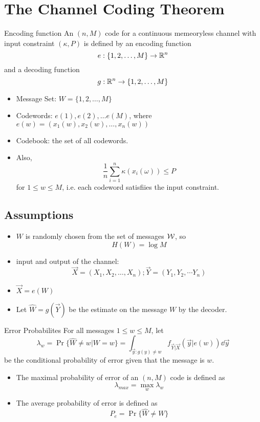 \documentclass[../main.tex]{subfiles}
\begin{document}
\section{The Channel Coding Theorem}
\begin{gbox}{Encoding function}
    An $(n,M)$ code for a continuous memeoryless channel with input constraint $(\kappa, P)$ is defined by an encoding function \[
    e:\{1,2,\dots,M\}\to \mathbb{R}^n
    \] and a decoding function \[
    g:\mathbb{R}^n \to \{1,2,\dots, M\}
    \]
    \begin{itemize}
        \item Message Set: $W=\{1,2,\dots, M\}$
        \item Codewords: $e(1),e(2),\dots e(M)$, where $e(w)=(x_1(w), x_2(w),\dots, x_n(w))$
        \item Codebook: the set of all codewords. 
        \item Also, \[
        \frac{1}{n}\sum_{i=1}^n\kappa(x_i(\omega))\leq P
        \] for $1\leq w \leq M$, i.e. each codeword satisfiies the input constraint.
    \end{itemize}
\end{gbox}
\subsection{Assumptions}
\begin{itemize}
    \item $W$ is randomly chosen from the set of messages $\mathcal{W}$, so \[
    H(W)=\log M
    \]
    \item input and output of the channel:\[
    \vec X = (X_1,X_2,\dots,X_n); \vec Y = (Y_1,Y_2,\dotsm Y_n)
    \]
    \item $\vec X = e(W)$
    \item Let $\hat{W} = g(\vec Y)$ be the estimate on the message $W$ by the decoder. 
\end{itemize}
\begin{gbox}{Error Probabilites}
    For all messages $1\leq w \leq M$, let \[
    \lambda_w = \Pr\{\hat W\neq w|W=w\}=\int_{\vec y:g(y)\neq w}f_{\vec Y|\vec X}(\vec y|e(w))\dd \vec y
    \] be the conditional probability of error given that the message is $w$.
    \begin{itemize}
        \item The maximal probability of error of an $(n,M)$ code is defined as \[
        \lambda_{max} = \max_w \lambda_w
        \]
        \item The average probability of error is defined as \[
        P_e = \Pr\{\hat W\neq W\}
        \]
    \end{itemize}
\end{gbox}
\end{document}
